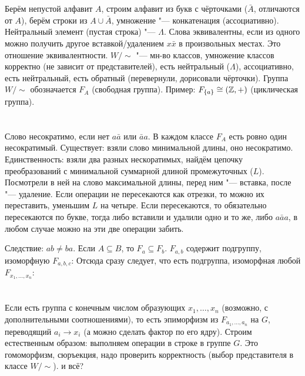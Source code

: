 \section{} %
Берём непустой алфавит $A$, строим алфавит из букв с чёрточками ($\bar A$, отличаются от $A$),
берём строки из $A\cup \bar A$, умножение "--- конкатенация (ассоциативно).
Нейтральный элемент (пустая строка) "--- $\Lambda$.
Слова эквивалентны, если из одного можно получить другое вставкой/удалением $x\bar x$ в произвольных местах.
Это отношение эквивалентности.
$W/\sim$ "--- мн-во классов, умножение классов корректно (не зависит от представителей),
есть нейтральный ($\Lambda$), ассоциативно, есть нейтральный, есть обратный (перевернули, дорисовали чёрточки).
Группа $W/\sim$ обозначается $F_A$ (свободная группа).
Пример: $F_{\{a\}} \cong (\mathbb{Z}, +)$ (циклическая группа).

\section{} %
Слово несократимо, если нет $a\bar a$ или $\bar a a$.
В каждом классе $F_A$ есть ровно один несократимый.
Существует: взяли слово минимальной длины, оно несократимо.
Единственность: взяли два разных нескоратимых, найдём цепочку преобразований с минимальной суммарной длиной промежуточных ($L$).
Посмотрели в ней на слово максимальной длины, перед ним "--- вставка, после "--- удаление.
Если операции не пересекаются как отрезки, то можно их переставить, уменьшим $L$ на четыре.
Если пересекаются, то обязательно пересекаются по букве, тогда либо вставили и удалили одно и то же,
либо $a\bar a a$, в любом случае можно на эти две операции забить.

Следствие: $ab\neq ba$.
Если $A \subseteq B$, то $F_a \subseteq F_b$.
$F_{a, b}$ содержит подгруппу, изоморфную $F_{a,b,c}$: \TODO
Отсюда сразу следует, что есть подгруппа, изоморфная любой $F_{x_1, \dots, x_n}$: \TODO

\section{} %
Если есть группа с конечным числом образующих $x_1, \dots, x_n$ (возможно, с дополнительными соотношениями),
то есть эпиморфизм из $F_{a_1, \dots, a_n}$ на $G$, переводящий $a_i \to x_i$ (а можно сделать фактор по его ядру).
Строим естественным образом: выполняем операции в строке в группе $G$.
Это гомоморфизм, сюръекция, надо проверить корректность (выбор представителя в классе $W/\sim$).
\TODO и всё?

\section{} %
